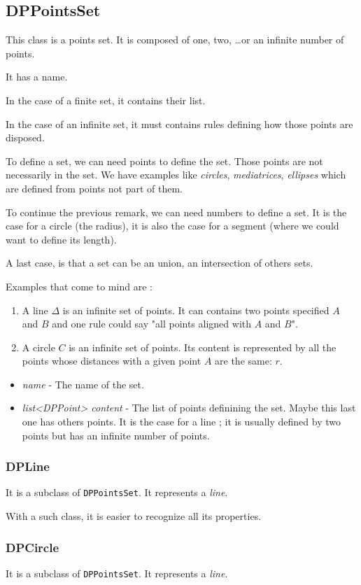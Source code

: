 \documentclass[a4paper]{article}
\begin{document}
\subsection{DPPointsSet}

This class is a points set. It is composed of one, two, \dots or an infinite number of points.

It has a name.

In the case of a finite set, it contains their list.

In the case of an infinite set, it must contains rules defining how those points are disposed.

To define a set, we can need points to define the set. Those points are not necessarily in the set. We have examples like \textit{circles}, \textit{mediatrices}, \textit{ellipses} which are defined from points not part of them.

To continue the previous remark, we can need numbers to define a set. It is the case for a circle (the radius), it is also the case for a segment (where we could want to define its length).

A last case, is that a set can be an union, an intersection of others sets.

Examples that come to mind are :

\begin{enumerate}
\item A line $\Delta$ is an infinite set of points. It can contains two points specified $A$ and $B$ and one rule could say "all points aligned with $A$ and $B$".
\item A circle $C$ is an infinite set of points. Its content is represented by all the points whose distances with a given point $A$ are the same: $r$.
\end{enumerate}


\begin{itemize}
\item \textit{name} - The name of the set.
\item \textit{list<DPPoint> content} - The list of points definining the set. Maybe this last one has others points. It is the case for a line ; it is usually defined by two points but has an infinite number of points.
\end{itemize}

\subsubsection{DPLine}

It is a subclass of \texttt{DPPointsSet}. It represents a \textit{line}.

With a such class, it is easier to recognize all its properties.

\subsubsection{DPCircle}

It is a subclass of \texttt{DPPointsSet}. It represents a \textit{line}.
\end{document}
